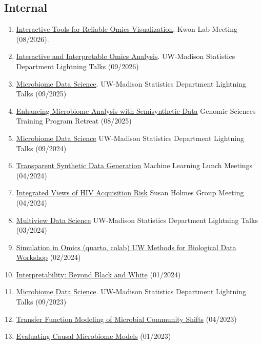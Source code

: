 \documentclass[letterpaper]{article}
\begin{document}
\subsection*{Internal}
\begin{enumerate}
  \item \href{https://go.wisc.edu/0nn20n}{Interactive Tools for Reliable Omics Visualization}. Kwon Lab Meeting (08/2026).
  \item \href{https://go.wisc.edu/669t74}{Interactive and Interpretable Omics Analysis}. UW-Madison Statistics Department Lightning Talks (09/2026)
  \item \href{https://go.wisc.edu/99ndjd}{Microbiome Data Science}. UW-Madison Statistics Department Lightning Talks (09/2025)
  \item \href{https://go.wisc.edu/4gl0is}{Enhancing Microbiome Analysis with Semisynthetic Data} Genomic Sciences Training Program Retreat (08/2025)
  \item \href{https://go.wisc.edu/05h9p7}{Microbiome Data Science} UW-Madison Statistics Department Lightning Talks (09/2024)
  \item \href{https://go.wisc.edu/694o2e}{Transparent Synthetic Data Generation} Machine Learning Lunch Meetings (04/2024)
  \item \href{https://go.wisc.edu/wi1952}{Integrated Views of HIV Acquisition Risk} Susan Holmes Group Meeting (04/2024)
  \item \href{https://krisrs1128.github.io/talks/2024/20240307/20240307.html#1}{Multiview Data Science} UW-Madison Statistics Department Lightning Talks (03/2024)
  \item \href{https://krisrs1128.github.io/talks/2024/20240207/20240207.html#1}{Simulation in Omics (\href{https://connect.doit.wisc.edu/content/f01c0d0c-ef3a-4129-bfcd-eb17ae109a89/simulation.html}{quarto}, \href{https://colab.research.google.com/drive/1IyMEQJwkslPzL9FYd5atvyGORqW9IrCI?usp=sharing}{colab}) UW Methods for Biological Data Workshop} (02/2024)
  \item \href{https://github.com/krisrs1128/talks/blob/master/2024/20240119/20240119.pptx}{Interpretability: Beyond Black and White} (01/2024)
  \item \href{https://go.wisc.edu/uhka79}{Microbiome Data Science}. UW-Madison Statistics Department Lightning Talks (09/2023)
  \item \href{https://krisrs1128.github.io/talks/2023/20230414/20230414.html}{Transfer Function Modeling of Microbial Community Shifts} (04/2023)
  \item \href{https://krisrs1128.github.io/talks/2023/20230120/20230120.html}{Evaluating Causal Microbiome Models} (01/2023)

\end{enumerate}
\end{document}
